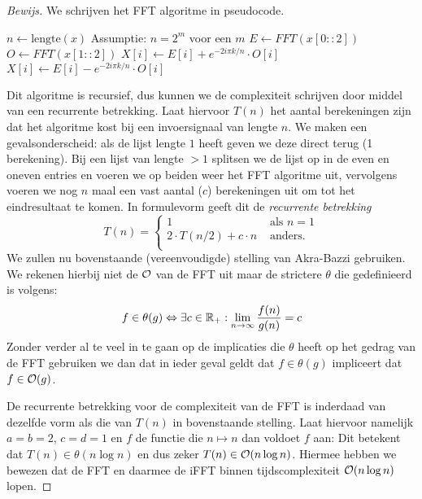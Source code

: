 \begin{proof}[Bewijs]
  We schrijven het FFT algoritme in pseudocode.

  \begin{algorithmic}
    \State $n \gets \text{lengte}(x)$ \Comment Assumptie: $n = 2^m$ voor een $m$
    \Else
    \State $E \gets FFT(x[0::2])$ 
    \State $O \gets FFT(x[1::2])$ 
    \State $X[i] \gets E[i] + e^{-2i \pi k/n} \cdot O[i]$
    \Else
    \State $X[i] \gets E[i] - e^{-2i \pi k/n} \cdot O[i]$
    \EndIf
    \EndFor
    \EndIf
    \State {}
    \EndFunction
  \end{algorithmic}

  Dit algoritme is recursief, dus kunnen we de complexiteit schrijven door middel van een recurrente betrekking. Laat hiervoor $T(n)$ het aantal berekeningen zijn dat het algoritme kost bij een invoersignaal van lengte $n$. We maken een gevalsonderscheid: als de lijst lengte $1$ heeft geven we deze direct terug (1 berekening). Bij een lijst van lengte $>1$ splitsen we de lijst op in de even en oneven entries en voeren we op beiden weer het FFT algoritme uit, vervolgens voeren we nog $n$ maal een vast aantal ($c$) berekeningen uit om tot het eindresultaat te komen. In formulevorm geeft dit de \emph{recurrente betrekking}
  \[
  T(n) = \begin{cases}
    1 &\text{ als } n = 1 \\
    2\cdot T(n/2) + c\cdot n &\text{ anders}. \\
  \end{cases}
  \]
  We zullen nu bovenstaande (vereenvoudigde) stelling van Akra-Bazzi gebruiken. We rekenen hierbij niet de $\mathcal{O}$ van de FFT uit maar de strictere $\theta$ die gedefinieerd is volgens:
  \[
  f \in \theta(g) \Leftrightarrow \exists c \in \mathbb{R}_+: \lim_{n \to \infty} \frac{f(n)}{g(n)} = c
  \]
  Zonder verder al te veel in te gaan op de implicaties die $\theta$ heeft op het gedrag van de FFT gebruiken we dan dat in ieder geval geldt dat $f \in \theta(g)$ impliceert dat $f \in \mathcal{O}(g)$.

  De recurrente betrekking voor de complexiteit van de FFT is inderdaad van dezelfde vorm als die van $T(n)$ in bovenstaande stelling.
  Laat hiervoor namelijk $a=b=2$, $c=d=1$ en $f$ de functie die $n\mapsto n$ dan voldoet $f$ aan:
  Dit betekent dat $T(n) \in \theta(n \log n)$ en dus zeker $T(n) \in \mathcal{O}(n \log n)$.
  Hiermee hebben we bewezen dat de FFT en daarmee de iFFT binnen tijdscomplexiteit $\mathcal{O}(n\log n)$ lopen.
\end{proof}

